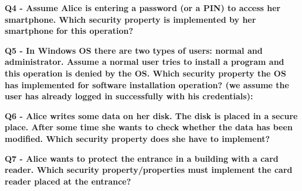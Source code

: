 \textbf{Q4 - Assume Alice is entering a password (or a PIN) to access her smartphone. Which security property is implemented by her smartphone for this operation?}

\textbf{Q5 - In Windows OS there are two types of users: normal and administrator. Assume a normal user tries to install a program and this operation is denied by the OS. Which security property the OS has implemented for software installation operation? (we assume the user has already logged in successfully with his credentials):}

\textbf{Q6 - Alice writes some data on her disk. The disk is placed in a secure place. After some time she wants to check whether the data has been modified. Which security property does she have to implement?}

\textbf{Q7 - Alice wants to protect the entrance in a building with a card reader. Which security property/properties must implement the card reader placed at the entrance?}

